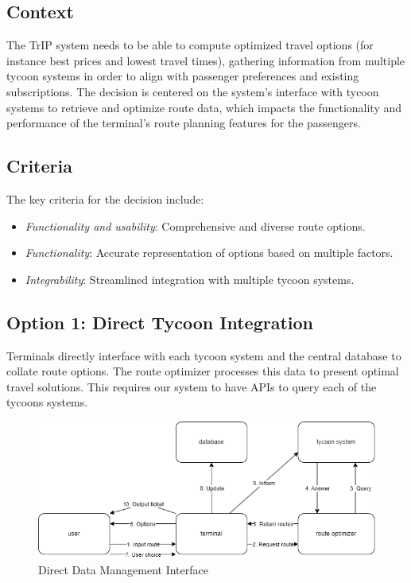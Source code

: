 \subsection*{Context}
The TrIP system needs to be able to compute optimized travel options (for instance best prices and lowest travel times), gathering information from multiple tycoon systems in order to align with passenger preferences and existing subscriptions.
The decision is centered on the system's interface with tycoon systems to retrieve and optimize route data, which impacts the functionality and performance of the terminal's route planning features for the passengers.

\subsection*{Criteria}
The key criteria for the decision include:
\begin{itemize}[noitemsep]
    \item \textit{Functionality and usability}: Comprehensive and diverse route options.
    \item \textit{Functionality}: Accurate representation of options based on multiple factors.
    \item \textit{Integrability}: Streamlined integration with multiple tycoon systems.
\end{itemize}

\subsection*{Option 1: Direct Tycoon Integration}
Terminals directly interface with each tycoon system and the central database to collate route options. The route optimizer processes this data to present optimal travel solutions. This requires our system to have APIs to query each of the tycoons systems.
\begin{figure}[ht]
    \centering
    \includegraphics[width=\textwidth]{drawings/decision3_drawings/direct.png}
    \caption{Direct Data Management Interface}
    \label{fig:direct-data-interface}
\end{figure}

